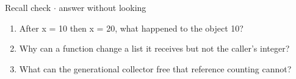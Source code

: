 \documentclass[11pt]{article}
\begin{document}
\begin{keepsection}
\begin{keepsection}
\begin{recallbox}{Recall check \ensuremath{\cdot} answer without looking}
\begin{enumerate}
\item After x = 10 then x = 20, what happened to the object 10?
\item Why can a function change a list it receives but not the caller’s integer?
\item What can the generational collector free that reference counting cannot?
\end{enumerate}

\end{recallbox}
\end{keepsection}
\end{keepsection}
\end{document}
